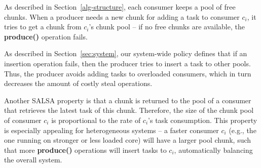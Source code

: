 As described in Section~\ref{alg-structure}, each consumer keeps a pool of free chunks.
When a producer needs a new chunk for adding a task to consumer $c_i$, it tries to get a chunk from $c_i$'s chunk pool -- if no free chunks are available, the {\bf produce()} operation fails.

As described in Section~\ref{sec:system}, our system-wide policy defines that if an insertion operation fails, then the producer tries to insert a task to other pools. Thus, the producer avoids adding tasks to overloaded consumers, which in turn decreases the amount of costly steal operations. 

Another SALSA property is that a chunk is returned to the pool of a consumer that retrieves the latest task of this chunk. 
Therefore, the size of the chunk pool of consumer $c_i$ is proportional to the rate of $c_i$'s task consumption.
This property is especially appealing for heterogeneous systems -- a faster consumer $c_i$ (e.g., the one running on stronger or less loaded core) will have a larger pool chunk, such that more {\bf produce()} operations will insert tasks to $c_i$, automatically balancing the overall system. 

